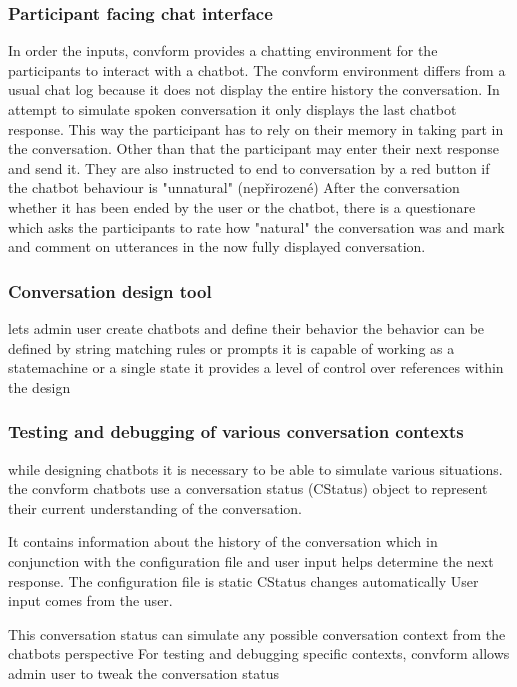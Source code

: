 \documentclass[12pt]{report}
\begin{document}
{\subsubsection{Participant facing chat interface}
In order the inputs, convform provides a chatting environment
for the participants to interact with a chatbot.
The convform environment differs from a usual chat log
because it does not display
the entire history the conversation.
In attempt to simulate spoken conversation
it only displays the last chatbot response.
This way the participant has to rely on their memory
in taking part in the conversation.
Other than that the participant may enter their next response
and send it.
They are also instructed to end to conversation by a red button
if the chatbot behaviour is "unnatural" (nepřirozené)
After the conversation whether it has been ended by the user or the chatbot,
there is a questionare which
asks the participants to rate how "natural" the conversation was
and mark and comment on utterances in the now fully displayed conversation.


\subsubsection{Conversation design tool}
lets admin user create chatbots and define their behavior
the behavior can be defined by string matching rules or prompts
it is capable of working as a statemachine or a single state
it provides a level of control over references within the design

\subsubsection{Testing and debugging of various conversation contexts}
while designing chatbots it is necessary to be able to simulate various situations.
the convform chatbots use a conversation status (CStatus) object
to represent their current understanding of the conversation.

It contains information about the history of the conversation
which in conjunction with the configuration file and user input
helps determine the next response.
The configuration file is static
CStatus changes automatically
User input comes from the user.

This conversation status can simulate any possible conversation context
from the chatbots perspective
For testing and debugging specific contexts, convform allows admin user
to tweak the conversation status

}
\end{document}

